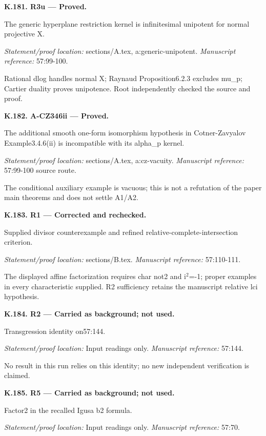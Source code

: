\par\medskip\noindent\textbf{K.181. R3u --- Proved.}\par
The generic hyperplane restriction kernel is infinitesimal unipotent for normal projective X.
\par\emph{Statement/proof location:} sections/A.tex, a:generic-unipotent.
\emph{Manuscript reference:} 57:99-100.
\par Rational dlog handles normal X; Raynaud Proposition6.2.3 excludes mu\_p; Cartier duality proves unipotence. Root independently checked the source and proof.
\par\medskip\noindent\textbf{K.182. A-CZ346ii --- Proved.}\par
The additional smooth one-form isomorphism hypothesis in Cotner-Zavyalov Example3.4.6(ii) is incompatible with its alpha\_p kernel.
\par\emph{Statement/proof location:} sections/A.tex, a:cz-vacuity.
\emph{Manuscript reference:} 57:99-100 source route.
\par The conditional auxiliary example is vacuous; this is not a refutation of the paper main theorems and does not settle A1/A2.
\par\medskip\noindent\textbf{K.183. R1 --- Corrected and rechecked.}\par
Supplied divisor counterexample and refined relative-complete-intersection criterion.
\par\emph{Statement/proof location:} sections/B.tex.
\emph{Manuscript reference:} 57:110-111.
\par The displayed affine factorization requires char not2 and i\ensuremath{{}^2}=-1; proper examples in every characteristic supplied. R2 sufficiency retains the manuscript relative lci hypothesis.
\par\medskip\noindent\textbf{K.184. R2 --- Carried as background; not used.}\par
Transgression identity on57:144.
\par\emph{Statement/proof location:} Input readings only.
\emph{Manuscript reference:} 57:144.
\par No result in this run relies on this identity; no new independent verification is claimed.
\par\medskip\noindent\textbf{K.185. R5 --- Carried as background; not used.}\par
Factor2 in the recalled Igusa b2 formula.
\par\emph{Statement/proof location:} Input readings only.
\emph{Manuscript reference:} 57:70.
